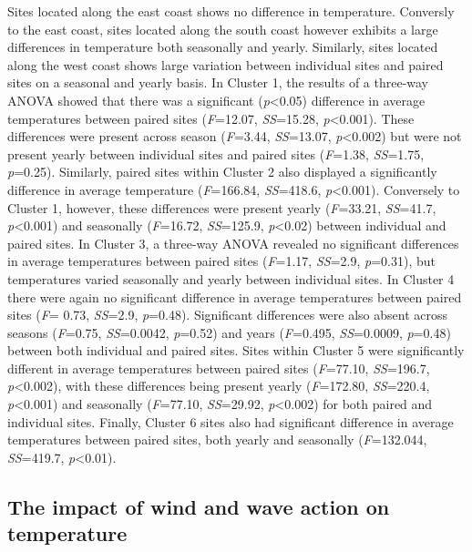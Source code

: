 \documentclass[10pt,a4paper,]{article}
\begin{document}
Sites located along the east coast shows no difference in temperature.
Conversly to the east coast, sites located along the south coast however
exhibits a large differences in temperature both seasonally and yearly.
Similarly, sites located along the west coast shows large variation
between individual sites and paired sites on a seasonal and yearly
basis. In Cluster 1, the results of a three-way ANOVA showed that there
was a significant (\emph{p}\textless{}0.05) difference in average
temperatures between paired sites (\emph{F}=12.07, \emph{SS}=15.28,
\emph{p}\textless{}0.001). These differences were present across season
(\emph{F}=3.44, \emph{SS}=13.07, \emph{p}\textless{}0.002) but were not
present yearly between individual sites and paired sites (\emph{F}=1.38,
\emph{SS}=1.75, \emph{p}=0.25). Similarly, paired sites within Cluster 2
also displayed a significantly difference in average temperature
(\emph{F}=166.84, \emph{SS}=418.6, \emph{p}\textless{}0.001). Conversely
to Cluster 1, however, these differences were present yearly
(\emph{F}=33.21, \emph{SS}=41.7, \emph{p}\textless{}0.001) and
seasonally (\emph{F}=16.72, \emph{SS}=125.9, \emph{p}\textless{}0.02)
between individual and paired sites. In Cluster 3, a three-way ANOVA
revealed no significant differences in average temperatures between
paired sites (\emph{F}=1.17, \emph{SS}=2.9, \emph{p}=0.31), but
temperatures varied seasonally and yearly between individual sites. In
Cluster 4 there were again no significant difference in average
temperatures between paired sites (\emph{F}= 0.73, \emph{SS}=2.9,
\emph{p}=0.48). Significant differences were also absent across seasons
(\emph{F}=0.75, \emph{SS}=0.0042, \emph{p}=0.52) and years
(\emph{F}=0.495, \emph{SS}=0.0009, \emph{p}=0.48) between both
individual and paired sites. Sites within Cluster 5 were significantly
different in average temperatures between paired sites (\emph{F}=77.10,
\emph{SS}=196.7, \emph{p}\textless{}0.002), with these differences being
present yearly (\emph{F}=172.80, \emph{SS}=220.4,
\emph{p}\textless{}0.001) and seasonally (\emph{F}=77.10,
\emph{SS}=29.92, \emph{p}\textless{}0.002) for both paired and
individual sites. Finally, Cluster 6 sites also had significant
difference in average temperatures between paired sites, both yearly and
seasonally (\emph{F}=132.044, \emph{SS}=419.7, \emph{p}\textless{}0.01).

\hypertarget{the-impact-of-wind-and-wave-action-on-temperature}{%
\subsection{The impact of wind and wave action on
temperature}\label{the-impact-of-wind-and-wave-action-on-temperature}}
\end{document}
